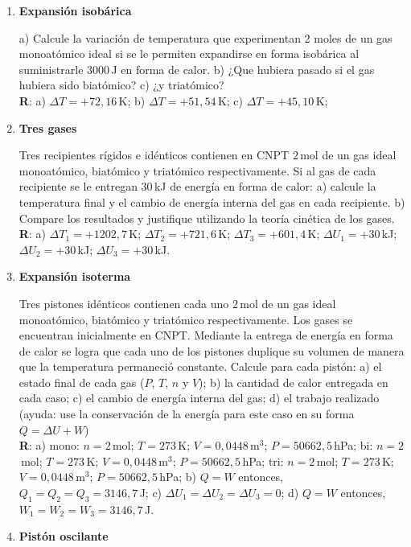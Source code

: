 \documentclass[a4paper,12pt]{article}
\begin{document}
\begin{enumerate}
	\item {\bf{Expansión isobárica}}
		
		a) Calcule la variación de temperatura que experimentan 2 moles de un
		gas monoatómico ideal si se le permiten expandirse en forma isobárica
		al suministrarle $3000$\,J en forma de calor. b) ¿Que hubiera pasado si
		el gas hubiera sido biatómico? c) ¿y triatómico?
		\\{\bf R}: a) $\Delta T = +72,16$\,K; b) $\Delta T = +51,54$\,K; c)
		$\Delta T = +45,10$\,K;

	\item {\bf{Tres gases}}

		Tres recipientes rígidos e idénticos contienen en CNPT $2$\,mol de un gas ideal
		monoatómico, biatómico y triatómico respectivamente. Si al gas de cada
		recipiente se le entregan $30$\,kJ de energía en forma de calor: a)
		calcule la temperatura final y el cambio de energía interna del gas en
		cada recipiente. b) Compare los resultados y justifique utilizando la
		teoría cinética de los gases.  
		\\{\bf R}: a) $\Delta T_1 = +1202,7$\,K; $\Delta T_2 = +721,6$\,K;
		$\Delta T_3 = +601,4$\,K; $\Delta U_1 = +30$\,kJ; $\Delta U_2 =
		+30$\,kJ; $\Delta U_3 = +30$\,kJ.

	\item {\bf{Expansión isoterma}}

		Tres pistones idénticos contienen cada uno $2$\,mol de un gas ideal
		monoatómico, biatómico y triatómico respectivamente. Los gases se
		encuentran inicialmente en CNPT. Mediante la entrega de energía en
		forma de calor se logra que cada uno de los pistones duplique su
		volumen de manera que la temperatura permaneció constante. Calcule para
		cada pistón: a) el estado final de cada gas ($P$, $T$, $n$ y $V$); b)
		la cantidad de calor entregada en cada caso; c) el cambio de energía
		interna del gas; d) el trabajo realizado (ayuda: use la conservación de
		la energía para este caso en su forma $Q=\Delta U + W$) 
		\\{\bf R}: a) mono: $n=2$\,mol; $T=273$\,K; $V=0,0448$\,m$^3$;
		$P=50662,5$\,hPa; bi: $n=2$\,mol; $T=273$\,K; $V=0,0448$\,m$^3$;
		$P=50662,5$\,hPa; tri: $n=2$\,mol; $T=273$\,K; $V=0,0448$\,m$^3$;
		$P=50662,5$\,hPa; b) $Q=W$ entonces, $Q_1 = Q_2 = Q_3 = 3146,7$\,J; c)
		$\Delta U_1 = \Delta U_2 = \Delta U_3 = 0$; d) $Q=W$ entonces, $W_1 =
		W_2 = W_3 = 3146,7$\,J.

	\item {\bf{Pistón oscilante}}


\end{enumerate}
\end{document}

